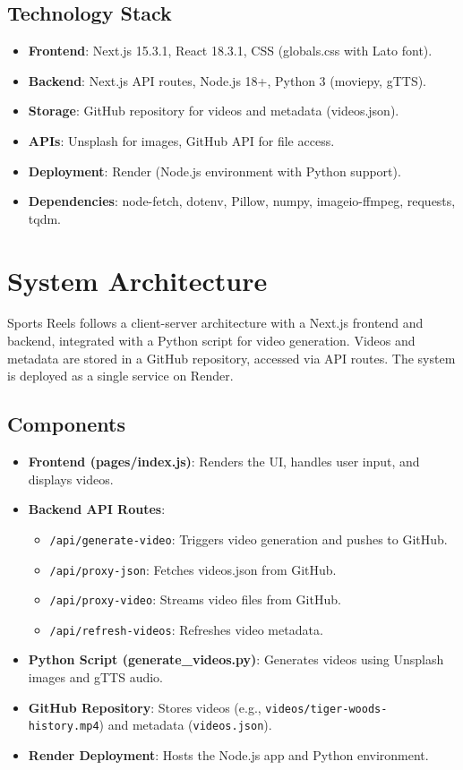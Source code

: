 \documentclass[a4paper,12pt]{article}
\begin{document}
\subsection{Technology Stack}
\begin{itemize}
    \item \textbf{Frontend}: Next.js 15.3.1, React 18.3.1, CSS (globals.css with Lato font).
    \item \textbf{Backend}: Next.js API routes, Node.js 18+, Python 3 (moviepy, gTTS).
    \item \textbf{Storage}: GitHub repository for videos and metadata (videos.json).
    \item \textbf{APIs}: Unsplash for images, GitHub API for file access.
    \item \textbf{Deployment}: Render (Node.js environment with Python support).
    \item \textbf{Dependencies}: node-fetch, dotenv, Pillow, numpy, imageio-ffmpeg, requests, tqdm.
\end{itemize}

\section{System Architecture}
Sports Reels follows a client-server architecture with a Next.js frontend and backend, integrated with a Python script for video generation. Videos and metadata are stored in a GitHub repository, accessed via API routes. The system is deployed as a single service on Render.

\subsection{Components}
\begin{itemize}
    \item \textbf{Frontend (pages/index.js)}: Renders the UI, handles user input, and displays videos.
    \item \textbf{Backend API Routes}:
        \begin{itemize}
            \item \texttt{/api/generate-video}: Triggers video generation and pushes to GitHub.
            \item \texttt{/api/proxy-json}: Fetches videos.json from GitHub.
            \item \texttt{/api/proxy-video}: Streams video files from GitHub.
            \item \texttt{/api/refresh-videos}: Refreshes video metadata.
        \end{itemize}
    \item \textbf{Python Script (generate\_videos.py)}: Generates videos using Unsplash images and gTTS audio.
    \item \textbf{GitHub Repository}: Stores videos (e.g., \texttt{videos/tiger-woods-history.mp4}) and metadata (\texttt{videos.json}).
    \item \textbf{Render Deployment}: Hosts the Node.js app and Python environment.
\end{itemize}
\end{document}

